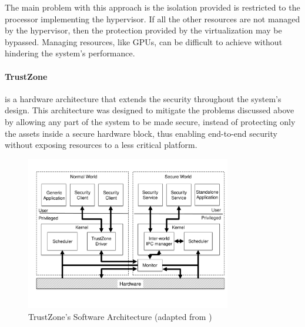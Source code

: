 The main problem with this approach is the isolation provided is restricted to the processor implementing the hypervisor. If all the other resources are not managed by the hypervisor, then the protection provided by the virtualization may be bypassed. Managing resources, like \ac{GPUs}, can be difficult to achieve without hindering the system's performance.


\paragraph{\textbf{TrustZone}} is a hardware architecture that extends the security throughout the system's design. This architecture was designed to mitigate the problems discussed above by allowing any part of the system to be made secure, instead of protecting only the assets inside a secure hardware block, thus enabling end-to-end security without exposing resources to a less critical platform.

\begin{figure}[t!]
	\centering
	\includegraphics[width=0.80\textwidth]{img/trustzone.pdf}
	\caption{TrustZone's Software Architecture (adapted from \cite{trustzone_whitepaper})}
	\label{fig:trustzone_architecture}
\end{figure}

